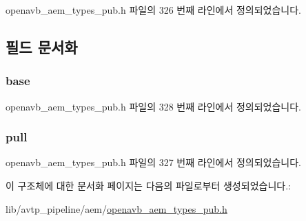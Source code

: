 openavb\+\_\+aem\+\_\+types\+\_\+pub.\+h 파일의 326 번째 라인에서 정의되었습니다.



\subsection{필드 문서화}
\subsubsection[{\texorpdfstring{base}{base}}]{ base}\hypertarget{structopenavb__aem__sampling__rate__t_ad25f20e8ea6ae8be0b21550178138a6e}{}\label{structopenavb__aem__sampling__rate__t_ad25f20e8ea6ae8be0b21550178138a6e}


openavb\+\_\+aem\+\_\+types\+\_\+pub.\+h 파일의 328 번째 라인에서 정의되었습니다.

\subsubsection[{\texorpdfstring{pull}{pull}}]{ pull}\hypertarget{structopenavb__aem__sampling__rate__t_af1ed3465afc211f5d24f8e8a54e1de51}{}\label{structopenavb__aem__sampling__rate__t_af1ed3465afc211f5d24f8e8a54e1de51}


openavb\+\_\+aem\+\_\+types\+\_\+pub.\+h 파일의 327 번째 라인에서 정의되었습니다.



이 구조체에 대한 문서화 페이지는 다음의 파일로부터 생성되었습니다.\+:\begin{DoxyCompactItemize}
\item 
lib/avtp\+\_\+pipeline/aem/\hyperlink{openavb__aem__types__pub_8h}{openavb\+\_\+aem\+\_\+types\+\_\+pub.\+h}\end{DoxyCompactItemize}
